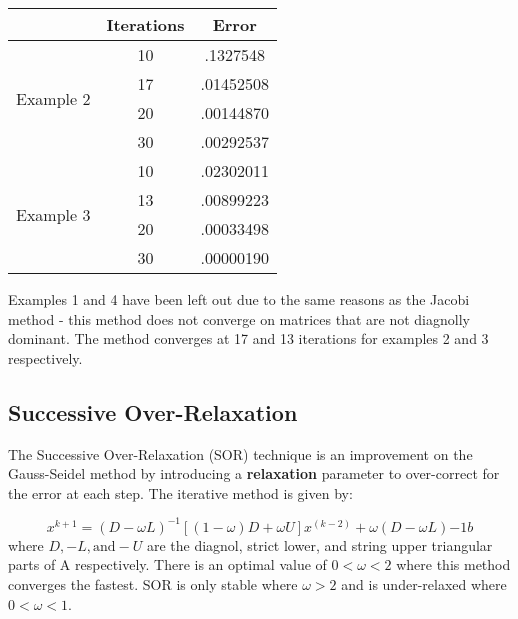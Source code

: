 \documentclass[11pt]{article}	%
\begin{document}
\begin{center}
    \begin{tabular}{||c|c|c||}
        \hline
        & Iterations & Error \\ [.35em]
        \hline
        \multirow{4}{5em}{Example 2} & 10 & .1327548 \\ [.25em]
        & 17 & .01452508 \\ [.25em]
        & 20 & .00144870 \\ [.25em]
        & 30 & .00292537 \\ [.25em]
        \hline
        \multirow{4}{5em}{Example 3} & 10 & .02302011 \\ [.25em]
        & 13 & .00899223 \\ [.25em]
        & 20 & .00033498 \\ [.25em]
        & 30 & .00000190 \\ [.25em]
        \hline
    \end{tabular}
\end{center}
Examples 1 and 4 have been left out due to the same reasons as the Jacobi method - this method does not converge on matrices that are not diagnolly dominant. The method converges at 17 and 13 iterations for examples 2 and 3 respectively.

\subsection{Successive Over-Relaxation}
The Successive Over-Relaxation (SOR) technique is an improvement on the Gauss-Seidel method by introducing a \textbf{relaxation} parameter to over-correct for the error at each step. The iterative method is given by:

\begin{equation}\label{eq:successive-over-relax-eq-1}
    x^{k+1} = (D - \omega L)^{-1}[(1 - \omega)D + \omega U]x^{(k-2)} + \omega(D - \omega L){-1}b
\end{equation}
where $D, -L, \textrm{and} -U$ are the diagnol, strict lower, and string upper triangular parts of A respectively. There is an optimal value of $0 < \omega < 2$ where this method converges the fastest. SOR is only stable where $\omega > 2$ and is under-relaxed where $0 < \omega < 1$.
\end{document}
